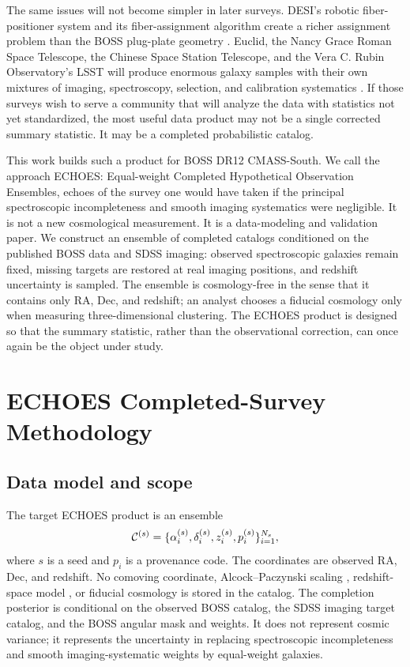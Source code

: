 \documentclass[apj]{emulateapj}
\begin{document}
The same issues will not become simpler in later surveys.  DESI's robotic
fiber-positioner system and its fiber-assignment algorithm create a richer
assignment problem than the BOSS plug-plate geometry
\citep{Silber2023,Pinol2017,Lan2023,Lasker2025}.  Euclid, the Nancy Grace
Roman Space Telescope, the Chinese Space Station Telescope, and the Vera C.
Rubin Observatory's LSST will produce enormous galaxy samples with their own
mixtures of imaging, spectroscopy, selection, and calibration systematics
\citep{Euclid2025,Wang2022,Miao2023,CSST2026,ZhanTyson2018}.  If those surveys
wish to serve a community that will analyze the data with statistics not yet
standardized, the most useful data product may not be a single corrected
summary statistic.  It may be a completed probabilistic catalog.

This work builds such a product for BOSS DR12 CMASS-South.  We call the
approach \textsc{ECHOES}: Equal-weight Completed Hypothetical Observation
Ensembles, echoes of the survey one would have taken if the principal
spectroscopic incompleteness and smooth imaging systematics were negligible.
It is not a new cosmological measurement.  It is a data-modeling and validation
paper.  We construct an ensemble of completed catalogs conditioned on the
published BOSS data and SDSS imaging: observed spectroscopic galaxies remain
fixed, missing targets are restored at real imaging positions, and redshift
uncertainty is sampled.  The ensemble is cosmology-free in the sense that it
contains only RA, Dec, and redshift; an analyst chooses a fiducial cosmology
only when measuring three-dimensional clustering.  The ECHOES product is
designed so that the summary statistic, rather than the observational
correction, can once again be the object under study.

\section{ECHOES Completed-Survey Methodology}
\label{sec:method}

\subsection{Data model and scope}
\label{subsec:datamodel}

The target ECHOES product is an ensemble
\begin{equation}
  {\cal C}^{(s)} =
  \{ \alpha_i^{(s)},\delta_i^{(s)},z_i^{(s)},p_i^{(s)} \}_{i=1}^{N_s},
  \label{eq:catalog}
\end{equation}
where $s$ is a seed and $p_i$ is a provenance code.  The coordinates are
observed RA, Dec, and redshift.  No comoving coordinate, Alcock--Paczynski
scaling \citep{AlcockPaczynski1979}, redshift-space model \citep{Kaiser1987},
or fiducial cosmology is stored in the catalog.  The completion posterior is
conditional on the observed BOSS catalog, the SDSS imaging target catalog, and
the BOSS angular mask and weights.  It does not represent cosmic variance; it
represents the uncertainty in replacing spectroscopic incompleteness and smooth
imaging-systematic weights by equal-weight galaxies.
\end{document}
